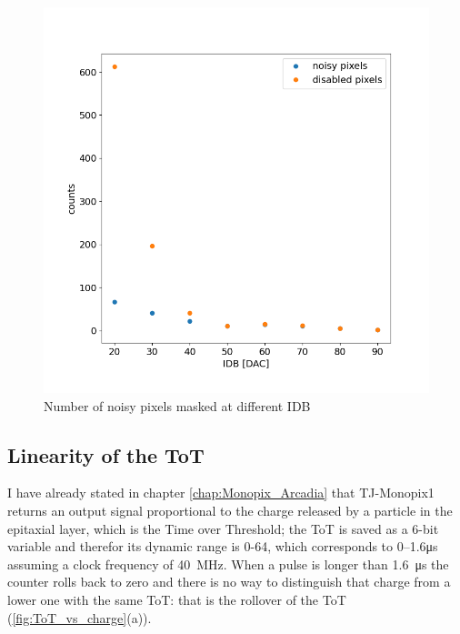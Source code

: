         \begin{figure}[h!]
            \centering
            \includegraphics[width=.70\linewidth]{figures/charaterization/noisy.png}
            \caption{Number of noisy pixels masked at different IDB}
            \label{fig:noisy_pixels}
        \end{figure}   


    \subsection{Linearity of the ToT}
        I have already stated in chapter \ref{chap:Monopix_Arcadia} that TJ-Monopix1 returns an output signal proportional to the charge released by a particle in the epitaxial layer, which is the Time over Threshold; the ToT is saved as a 6-bit variable and therefor its dynamic range is 0-64, which corresponds to \numrange[range-phrase = --]{0}{1.6}\si{\us} assuming a clock frequency of \SI{40}{MHz}.
        When a pulse is longer than \SI{1.6}{\us} the counter rolls back to zero and there is no way to distinguish that charge from a lower one with the same ToT: that is the rollover of the ToT (\ref{fig:ToT_vs_charge}(a)).   

